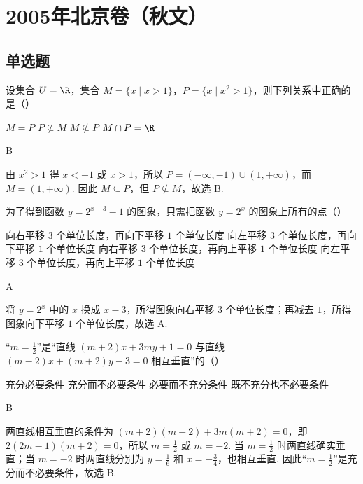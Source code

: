\chapter{2005年北京卷（秋文）}
\section{单选题}
\begin{problem}
设集合 \(U=\R\)，集合 \(M=\{x\mid x>1\}\)，\(P=\{x\mid x^2>1\}\)，则下列关系中正确的是（\quad）

\choices
    {\(M=P\)}
    {\(P\not\subseteq M\)}
    {\(M\not\subseteq P\)}
    {\(M\cap P=\R\)}
\begin{answer}
B
\end{answer}
\end{problem}

\begin{solution}
由 \(x^2>1\) 得 \(x<-1\) 或 \(x>1\)，所以 \(P=(-\infty,-1)\cup(1,+\infty)\)，而 \(M=(1,+\infty)\). 因此 \(M\subseteq P\)，但 \(P\not\subseteq M\)，故选 B.
\end{solution}

\begin{problem}
为了得到函数 \(y=2^{x-3}-1\) 的图象，只需把函数 \(y=2^x\) 的图象上所有的点（\quad）

\choices
    {向右平移 \(3\) 个单位长度，再向下平移 \(1\) 个单位长度}
    {向左平移 \(3\) 个单位长度，再向下平移 \(1\) 个单位长度}
    {向右平移 \(3\) 个单位长度，再向上平移 \(1\) 个单位长度}
    {向左平移 \(3\) 个单位长度，再向上平移 \(1\) 个单位长度}
\begin{answer}
A
\end{answer}
\end{problem}

\begin{solution}
将 \(y=2^x\) 中的 \(x\) 换成 \(x-3\)，所得图象向右平移 \(3\) 个单位长度；再减去 \(1\)，所得图象向下平移 \(1\) 个单位长度，故选 A.
\end{solution}

\begin{problem}
“\(m=\frac{1}{2}\)”是“直线 \((m+2)x+3my+1=0\) 与直线 \((m-2)x+(m+2)y-3=0\) 相互垂直”的（\quad）

\choices
    {充分必要条件}
    {充分而不必要条件}
    {必要而不充分条件}
    {既不充分也不必要条件}
\begin{answer}
B
\end{answer}
\end{problem}

\begin{solution}
两直线相互垂直的条件为 \((m+2)(m-2)+3m(m+2)=0\)，即 \(2(2m-1)(m+2)=0\)，所以 \(m=\frac12\) 或 \(m=-2\). 当 \(m=\frac12\) 时两直线确实垂直；当 \(m=-2\) 时两直线分别为 \(y=\frac16\) 和 \(x=-\frac34\)，也相互垂直. 因此“\(m=\frac12\)”是充分而不必要条件，故选 B.
\end{solution}

